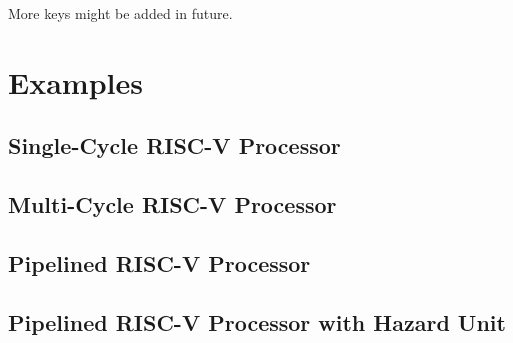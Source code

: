 \documentclass[.52pt,a4paper,titlepage]{article}
\begin{document}
\vspace{\baselineskip}
More keys might be added in future.

\newpage
\section{Examples}
\subsection{Single-Cycle RISC-V Processor}
\begin{center}
	\resizebox*{\textwidth}{!}{
		
	}
\end{center}


\subsection{Multi-Cycle RISC-V Processor}
\begin{center}
	\resizebox*{\textwidth}{!}{
		
	}
	\resizebox*{\textwidth}{!}{
		
	}
\end{center}

\subsection{Pipelined RISC-V Processor}
\begin{center}
	\resizebox*{\textwidth}{!}{
		
	}
\end{center}

\subsection{Pipelined RISC-V Processor with Hazard Unit}
\begin{center}
	\resizebox*{\textwidth}{!}{
		
	}
\end{center}
\end{document}
